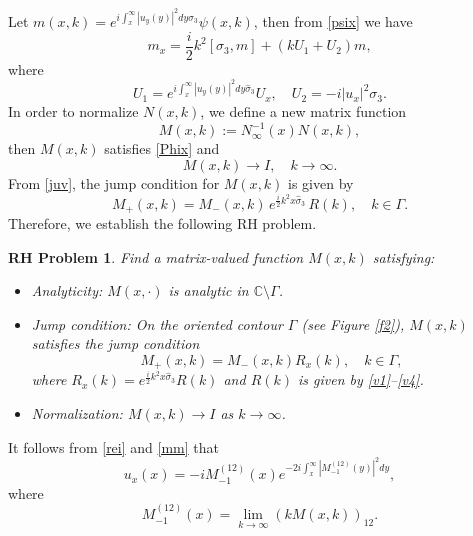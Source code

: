 \documentclass[preprint,compress,12pt]{elsarticle}
\newtheorem{rhp}{RH Problem}
\numberwithin{equation}{section}
\begin{document}
Let $m(x,k)=e^{i\int_{x}^{\infty}|u_{y}(y)|^{2}dy\sigma_{3}}\psi(x,k)$, then from \eqref{psix} we have
\begin{equation}\label{Phix}
m_{x}=\frac{i}{2}k^{2}\left[\sigma_{3},m\right]+\left(kU_{1}+U_{2}\right)m,
\end{equation}
where
\begin{equation*}
U_{1}=e^{i\int_{x}^{\infty}|u_{y}(y)|^{2}dy\widehat{\sigma}_{3}}U_{x},\quad U_{2}=-i|u_{x}|^{2}\sigma_{3}.
\end{equation*}
In order to normalize $N(x,k)$, we define a new matrix function
\begin{equation}\label{mm}
M(x,k):=N_{\infty}^{-1}(x)N(x,k),
\end{equation}
then $M(x,k)$ satisfies \eqref{Phix} and
\begin{equation}
M(x,k)\rightarrow I, \quad k\rightarrow \infty.
\end{equation}
From \eqref{juv}, the jump condition for $M(x,k)$ is given by
\begin{equation}\label{matn}
M_{+}(x,k)=M_{-}(x,k)\,e^{\frac{i}{2}k^{2}x\widehat{\sigma}_{3}}\,R(k),\quad k\in\Gamma.
\end{equation}
Therefore, we establish the following RH problem.
\begin{rhp}\label{RH1}
Find a matrix-valued function $M(x,k)$ satisfying:
\begin{itemize}
  \item Analyticity: $M(x,\cdot)$ is analytic in $\mathbb{C}\setminus\Gamma$.
  \item Jump condition:
  On the oriented contour $\Gamma$ (see Figure \ref{f2}), $M(x,k)$ satisfies the jump condition
      \begin{equation}
      M_{+}(x,k)=M_{-}(x,k)R_{x}(k),\quad k\in\Gamma,
      \end{equation}
      where $R_{x}(k)=e^{\frac{i}{2}k^{2}x\widehat{\sigma}_{3}}R(k)$ and $R(k)$ is given by \eqref{v1}--\eqref{v4}.
  \item Normalization: $M(x,k)\rightarrow I$ as $k\rightarrow\infty$.
\end{itemize}
\end{rhp}
It follows from \eqref{rei} and \eqref{mm} that
\begin{equation}\label{recn1}
u_{x}(x)=-iM_{-1}^{(12)}(x)e^{-2i\int_{x}^{\infty}|M_{-1}^{(12)}(y)|^{2}dy},
\end{equation}
where
\begin{equation}\label{m-1}
M_{-1}^{(12)}(x)=\lim\limits_{k\rightarrow\infty}\left(kM(x,k)\right)_{12}.
\end{equation}
\end{document}
